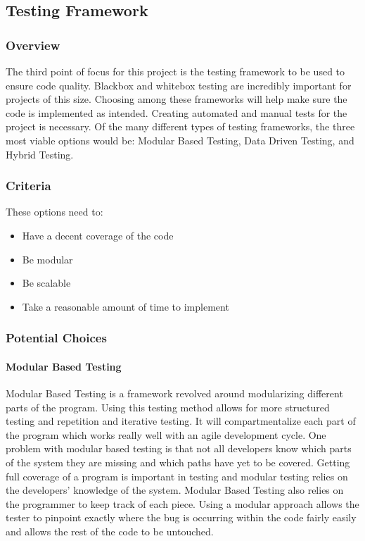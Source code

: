 \subsection{Testing Framework}
\subsubsection{Overview}
The third point of focus for this project is the testing framework to be used to ensure code quality. Blackbox and whitebox testing are incredibly important for projects of this size. Choosing among these frameworks will help make sure the code is implemented as intended. Creating automated and manual tests for the project is necessary. Of the many different types of testing frameworks, the three most viable options would be: Modular Based Testing, Data Driven Testing, and Hybrid Testing. 
\subsubsection{Criteria}
These options need to:
\begin{itemize}
	\item Have a decent coverage of the code
    \item Be modular
    \item Be scalable
    \item Take a reasonable amount of time to implement
\end{itemize}

\subsubsection{Potential Choices}
\paragraph{Modular Based Testing}
Modular Based Testing is a framework revolved around modularizing different parts of the program. Using this testing method allows for more structured testing and repetition and iterative testing. It will compartmentalize each part of the program which works really well with an agile development cycle. One problem with modular based testing is that not all developers know which parts of the system they are missing and which paths have yet to be covered. Getting full coverage of a program is important in testing and modular testing relies on the developers' knowledge of the system. Modular Based Testing also relies on the programmer to keep track of each piece. Using a modular approach allows the tester to pinpoint exactly where the bug is occurring within the code fairly easily and allows the rest of the code to be untouched.
